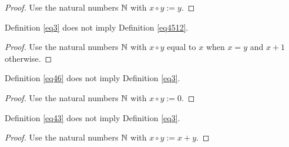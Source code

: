 \begin{proof}\leanok Use the natural numbers $\mathbb{N}$ with $x \circ y := y$.
\end{proof}

\begin{theorem}\label{3_not_imply_4512}\leanok{} Definition \ref{eq3} does not imply Definition \ref{eq4512}.
\end{theorem}

\begin{proof}\leanok Use the natural numbers $\mathbb{N}$ with $x \circ y$ equal to $x$ when $x=y$ and $x+1$ otherwise.
\end{proof}

\begin{theorem}\label{46_not_imply_3}\leanok{} Definition \ref{eq46} does not imply Definition \ref{eq3}.
\end{theorem}

\begin{proof}\leanok Use the natural numbers $\mathbb{N}$ with $x \circ y := 0$.
\end{proof}

\begin{theorem}\label{43_not_imply_3}\leanok{} Definition \ref{eq43} does not imply Definition \ref{eq3}.
\end{theorem}

\begin{proof}\leanok Use the natural numbers $\mathbb{N}$ with $x \circ y := x+y$.
\end{proof}

